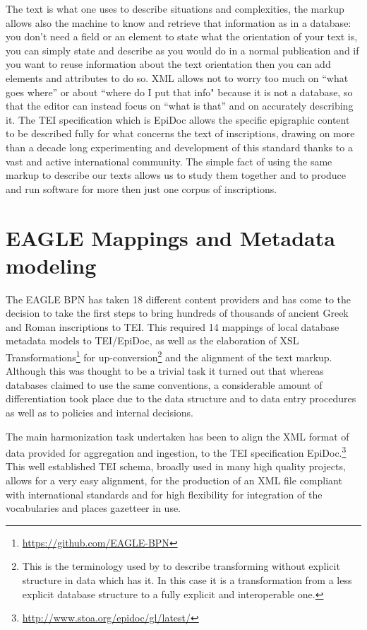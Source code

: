 \documentclass[amsthm,ebook]{saparticle}
\begin{document}
The text is what one uses to describe situations and complexities, the markup allows also the machine to know and retrieve that information as in a database: you don't need a field or an element to state what the orientation of your text is, you can simply state and describe as you would do in a normal publication and if you want to reuse information about the text orientation then you can add elements and attributes to do so. XML allows not to worry too much on ``what goes where'' or about ``where do I put that info" because it is not a database, so that the editor can instead focus on ``what is that'' and on accurately describing it. The TEI specification which is EpiDoc allows the specific epigraphic content to be described fully for what concerns the text of inscriptions, drawing on more than a decade long experimenting and development of this standard thanks to a vast and active international community. The simple fact of using the same markup to describe our texts allows us to study them together and to produce and run software for more then just one corpus of inscriptions. 

\section{EAGLE Mappings and Metadata modeling}
\noindent The EAGLE BPN has taken 18 different content providers and has come to
the decision to take the first steps to bring hundreds of thousands of
ancient Greek and Roman inscriptions to TEI. This required 14 mappings
of local database metadata models to TEI/EpiDoc, as well as the elaboration of
XSL Transformations\footnote{\url{https://github.com/EAGLE-BPN}} for up-conversion\footnote{This is the terminology used by \citet[906]{Kay} to describe transforming without explicit structure in data which has it. In this case it is a transformation from a less explicit database structure to a fully explicit and interoperable one.} and the alignment of the text
markup. Although this was thought to be a trivial task it turned out
that whereas databases claimed to use the same conventions, a considerable amount of differentiation took place due to the data structure and to data entry procedures as well as to policies and internal decisions. 

The main harmonization task undertaken has been to align the XML format
of data provided for aggregation and ingestion, to the TEI
specification EpiDoc.\footnote{\url{http://www.stoa.org/epidoc/gl/latest/}} This well established TEI schema, broadly used in
many high quality projects, allows for a very easy alignment, for the
production of an XML file compliant with international standards and
for high flexibility for integration of the vocabularies and places
gazetteer in use.
\end{document}
